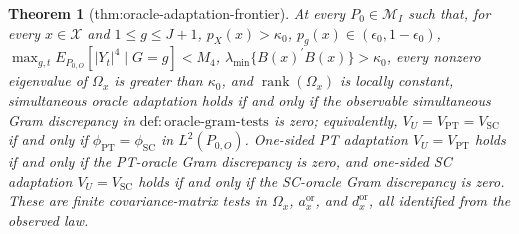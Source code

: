 \documentclass{article}
\newtheorem{theorem}{Theorem}
\begin{document}
\begin{theorem}[thm:oracle-adaptation-frontier]\label{thm:oracle-adaptation-frontier}
At every \(P_0\in\mathcal M_I\) such that, for every \(x\in\mathcal X\) and \(1\le g\le J+1\), \(p_X(x)>\kappa_0\), \(p_g(x)\in(\epsilon_0,1-\epsilon_0)\), \(\max_{g,t}E_{P_{0,O}}[|Y_t|^4\mid G=g]<M_4\), \(\lambda_{\min}\{B(x)^{\prime}B(x)\}>\kappa_0\), every nonzero eigenvalue of \(\Omega_x\) is greater than \(\kappa_0\), and \(\operatorname{rank}(\Omega_x)\) is locally constant, simultaneous oracle adaptation holds if and only if the observable simultaneous Gram discrepancy in \(\mathrm{def{:}oracle\text{-}gram\text{-}tests}\) is zero; equivalently, \(V_U=V_{\mathrm{PT}}=V_{\mathrm{SC}}\) if and only if \(\phi_{\mathrm{PT}}=\phi_{\mathrm{SC}}\) in \(L^2(P_{0,O})\). One-sided PT adaptation \(V_U=V_{\mathrm{PT}}\) holds if and only if the PT-oracle Gram discrepancy is zero, and one-sided SC adaptation \(V_U=V_{\mathrm{SC}}\) holds if and only if the SC-oracle Gram discrepancy is zero. These are finite covariance-matrix tests in \(\Omega_x\), \(a_x^{\mathrm{or}}\), and \(d_x^{\mathrm{or}}\), all identified from the observed law.
\end{theorem}
\end{document}
